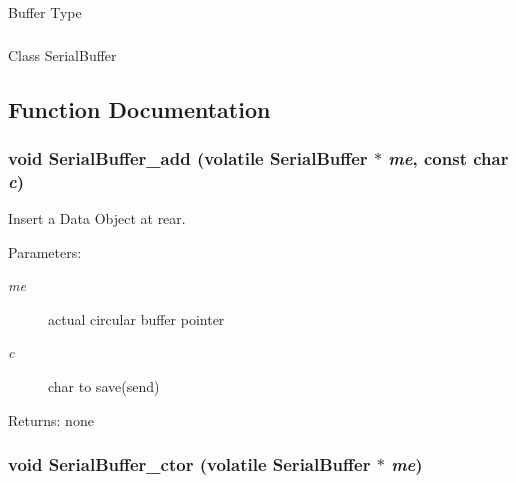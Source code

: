 Buffer Type \hypertarget{group__serialbuffer_g36e664fa27ce3c7a3bac11261a96d3fc}{
\subsubsection[{SerialBuffer}]{}}
\label{group__serialbuffer_g36e664fa27ce3c7a3bac11261a96d3fc}


Class SerialBuffer 

\subsection{Function Documentation}
\hypertarget{group__serialbuffer_g2b16eeee32d0ed95d1beb03252b10933}{
\subsubsection[{SerialBuffer\_\-add}]{\setlength{\rightskip}{0pt plus 5cm}void SerialBuffer\_\-add (volatile {\bf SerialBuffer} $\ast$ {\em me}, \/  const char {\em c})}}
\label{group__serialbuffer_g2b16eeee32d0ed95d1beb03252b10933}


Insert a Data Object at rear. \begin{Desc}
\item[Parameters:]
\begin{description}
\item[{\em me}]actual circular buffer pointer \item[{\em c}]char to save(send) \end{description}
\end{Desc}
\begin{Desc}
\item[Returns:]none \end{Desc}
\hypertarget{group__serialbuffer_g4e993e27527b5b7362c46ca16fce9854}{
\subsubsection[{SerialBuffer\_\-ctor}]{\setlength{\rightskip}{0pt plus 5cm}void SerialBuffer\_\-ctor (volatile {\bf SerialBuffer} $\ast$ {\em me})}}
\label{group__serialbuffer_g4e993e27527b5b7362c46ca16fce9854}


